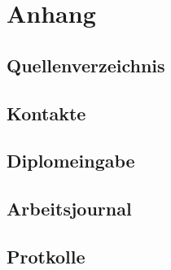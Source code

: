 \section{Anhang}
\clearpage
\renewcommand{\refname}{Literaturverzeichnis}
\subsection{Quellenverzeichnis}



\subsection{Kontakte}
\label{Anhang/Kontakte.tex}

\subsection{Diplomeingabe}
\label{app:Diplomeingabe}


\subsection{Arbeitsjournal}
\label{app:Arbeitsjournal}


\subsection{Protkolle}
\label{app:Protokolle}






%
\clearpage


